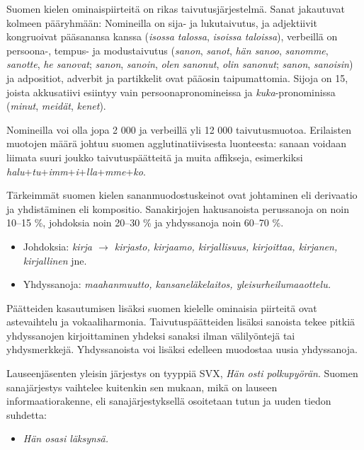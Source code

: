 \documentclass[]{../../metanetpaper}
\begin{document}
\begin{Parallel}[c]{77mm}{77mm}
{Suomen kielen ominaispiirteitä on rikas taivutusjärjestelmä. Sanat jakautuvat
kolmeen pääryhmään: Nomineilla on sija- ja lukutaivutus, ja adjektiivit
kongruoivat pääsanansa kanssa (\textit{isossa talossa}, \textit{isoissa taloissa}), verbeillä on
persoona-, tempus- ja modustaivutus (\textit{sanon}, \textit{sanot}, \textit{hän sanoo}, \textit{sanomme}, \textit{sanotte},
\textit{he sanovat}; \textit{sanon}, \textit{sanoin}, \textit{olen sanonut}, \textit{olin sanonut}; \textit{sanon}, \textit{sanoisin}) ja
adpositiot, adverbit ja partikkelit ovat pääosin taipumattomia. Sijoja on 15,
joista akkusatiivi esiintyy vain persoonapronomineissa ja \textit{kuka}-pronominissa (\textit{minut}, \textit{meidät}, \textit{kenet}).



Nomineilla voi olla jopa 2 000 ja verbeillä yli 12 000 taivutusmuotoa.
Erilaisten muotojen määrä johtuu suomen agglutinatiivisesta luonteesta: sanaan
voidaan liimata suuri joukko taivutuspäätteitä ja muita affikseja, esimerkiksi
\textit{halu}+\textit{tu}+\textit{imm}+\textit{i}+\textit{lla}+\textit{mme}+\textit{ko}.

Tärkeimmät suomen kielen sananmuodostuskeinot ovat johtaminen eli derivaatio ja
yhdistäminen eli kompositio. Sanakirjojen hakusanoista perussanoja on noin
10–15 \%, johdoksia noin 20–30 \% ja yhdyssanoja noin 60–70 \%.
\begin{itemize}
\item Johdoksia: \textit{kirja $\to$ kirjasto, kirjaamo, kirjallisuus, kirjoittaa, kirjanen,
    kirjallinen} jne.

\item Yhdyssanoja: \textit{maahanmuutto, kansaneläkelaitos, yleisurheilumaaottelu.}
\end{itemize}

Päätteiden kasautumisen lisäksi suomen kielelle ominaisia piirteitä ovat
astevaihtelu ja vokaaliharmonia. Taivutuspäätteiden lisäksi sanoista tekee
pitkiä yhdyssanojen kirjoittaminen yhdeksi sanaksi ilman välilyöntejä tai
yhdysmerkkejä. Yhdyssanoista voi lisäksi edelleen muodostaa uusia yhdyssanoja.

Lauseenjäsenten yleisin järjestys on tyyppiä SVX, \textit{Hän osti polkupyörän}. Suomen
sanajärjestys vaihtelee kuitenkin sen mukaan, mikä on lauseen
informaatiorakenne, eli sanajärjestyksellä osoitetaan tutun ja uuden tiedon
suhdetta:
\begin{itemize}
\item \textit{Hän osasi läksynsä.}


\end{itemize}}
\end{Parallel}
\end{document}
